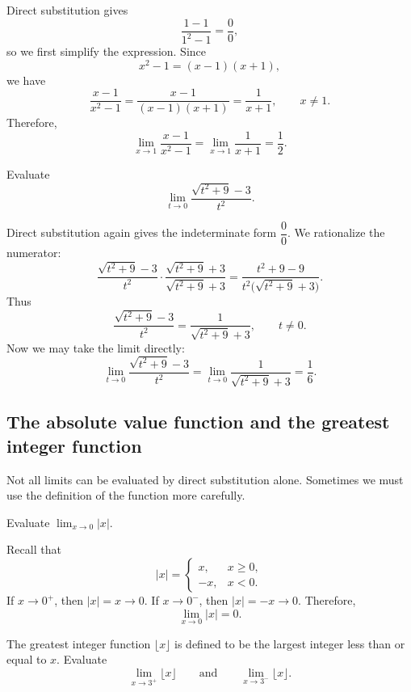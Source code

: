 \begin{solution}
Direct substitution gives
\[
\frac{1-1}{1^{2}-1}=\frac{0}{0},
\]
so we first simplify the expression. Since
\[
x^{2}-1=(x-1)(x+1),
\]
we have
\[
\frac{x-1}{x^{2}-1}
=
\frac{x-1}{(x-1)(x+1)}
=
\frac{1}{x+1},
\qquad x\ne 1.
\]
Therefore,
\[
\lim_{x\to 1}\frac{x-1}{x^{2}-1}
=
\lim_{x\to 1}\frac{1}{x+1}
=
\frac{1}{2}.
\]
\end{solution}

\begin{example}
Evaluate
\[
\lim_{t\to 0}\frac{\sqrt{t^{2}+9}-3}{t^{2}}.
\]
\end{example}

\begin{solution}
Direct substitution again gives the indeterminate form \(\dfrac{0}{0}\). We rationalize the numerator:
\[
\frac{\sqrt{t^{2}+9}-3}{t^{2}}
\cdot
\frac{\sqrt{t^{2}+9}+3}{\sqrt{t^{2}+9}+3}
=
\frac{t^{2}+9-9}{t^{2}\bigl(\sqrt{t^{2}+9}+3\bigr)}.
\]
Thus
\[
\frac{\sqrt{t^{2}+9}-3}{t^{2}}
=
\frac{1}{\sqrt{t^{2}+9}+3},
\qquad t\ne 0.
\]
Now we may take the limit directly:
\[
\lim_{t\to 0}\frac{\sqrt{t^{2}+9}-3}{t^{2}}
=
\lim_{t\to 0}\frac{1}{\sqrt{t^{2}+9}+3}
=
\frac{1}{6}.
\]
\end{solution}

\subsection{The absolute value function and the greatest integer function}

Not all limits can be evaluated by direct substitution alone. Sometimes we must use the definition of the function more carefully.

\begin{example}
Evaluate
\(\displaystyle
\lim_{x\to 0}|x|.
\)
\end{example}

\begin{solution}
Recall that
\[
|x|=
\begin{cases}
x, & x\ge 0,\\[4pt]
-x, & x<0.
\end{cases}
\]
If \(x\to 0^{+}\), then \(|x|=x\to 0\). If \(x\to 0^{-}\), then \(|x|=-x\to 0\). Therefore,
\[
\lim_{x\to 0}|x|=0.
\]
\end{solution}

\begin{example}
The greatest integer function \(\lfloor x \rfloor\) is defined to be the largest integer less than or equal to \(x\). Evaluate
\[
\lim_{x\to 3^{+}}\lfloor x \rfloor
\qquad \text{and} \qquad
\lim_{x\to 3^{-}}\lfloor x \rfloor.
\]
\end{example}

